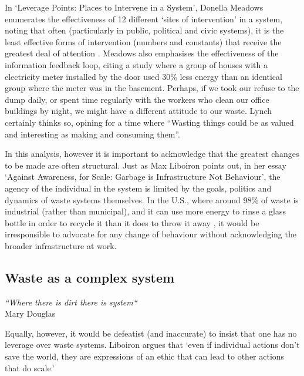 \documentclass[nofonts,nols,justified,nobib]{tufte-book}
\begin{document}
In `Leverage Points: Places to Intervene in a System', Donella Meadows enumerates the effectiveness of 12 different `sites of intervention' in a system, noting that often (particularly in public, political and civic systems), it is the least effective forms of intervention (numbers and constants) that receive the greatest deal of attention \cite{meadows_leverage_1997}. Meadows also emphasises the effectiveness of the information feedback loop, citing a study where a group of houses with a electricity meter installed by the door used 30\% less energy than an identical group where the meter was in the basement. Perhaps, if we took our refuse to the dump daily, or spent time regularly with the workers who clean our office buildings by night, we might have a different attitude to our waste. Lynch certainly thinks so, opining for a time where ``Wasting things could be as valued and interesting as making and consuming them''. %

In this analysis, however it is important to acknowledge that the greatest changes to be made are often structural. Just as Max Liboiron points out, in her essay `Against Awareness, for Scale: Garbage is Infrastructure Not Behaviour', the agency of the individual in the system is limited by the goals, politics and dynamics of waste systems themselves. In the U.S., where around 98\% of waste is industrial (rather than municipal)\cite{liboiron_against_2014}, and it can use more energy to rinse a glass bottle in order to recycle it than it does to throw it away \cite{tierney_reign_2018}, it would be irresponsible to advocate for any change of behaviour without acknowledging the broader infrastructure at work.

\subsection*{Waste as a complex system}

\begin{flushright}
\emph{``Where there is dirt there is system``} \cite{douglas_purity_1966}\\
Mary Douglas 
\end{flushright}

Equally, however, it would be defeatist (and inaccurate) to insist that one has no leverage over waste systems. Liboiron argues that `even if individual actions don't save the world, they are expressions of an ethic that can lead to other actions that do scale.'\cite{liboiron_against_2014}
\end{document}

